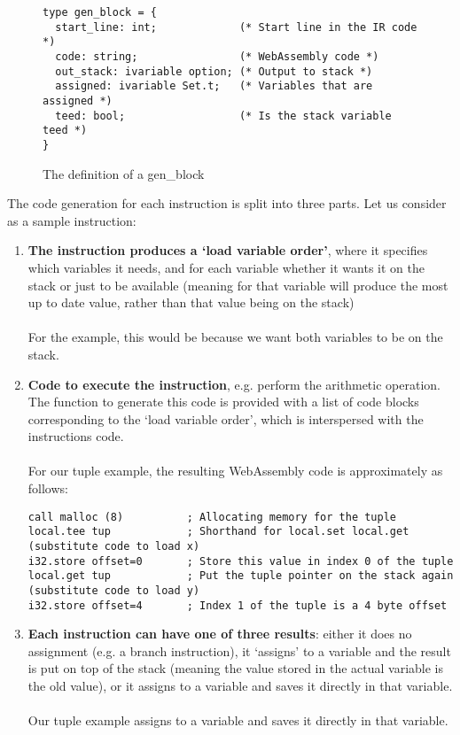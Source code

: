 \begin{figure}[h]
\begin{verbatim}
type gen_block = {
  start_line: int;             (* Start line in the IR code *)
  code: string;                (* WebAssembly code *)
  out_stack: ivariable option; (* Output to stack *)
  assigned: ivariable Set.t;   (* Variables that are assigned *)
  teed: bool;                  (* Is the stack variable teed *)
}
\end{verbatim}
\caption{The definition of a gen\_block}
\label{fig:genblock}
\end{figure}

The code generation for each instruction is split into three parts. Let us consider  as a sample instruction:
\begin{enumerate}
\item \textbf{The instruction produces a `load variable order'}, where it specifies which variables it needs, and for each variable whether it wants it on the stack or just to be available (meaning  for that variable will produce the most up to date value, rather than that value being on the stack)
\\\\
For the example, this would be  because we want both variables to be on the stack.

\item \textbf{Code to execute the instruction}, e.g. perform the arithmetic operation. The function to generate this code is provided with a list of code blocks corresponding to the `load variable order', which is interspersed with the instructions code.
\\\\
For our tuple example, the resulting WebAssembly code is approximately as follows:
\begin{verbatim}
call malloc (8)          ; Allocating memory for the tuple
local.tee tup            ; Shorthand for local.set local.get
(substitute code to load x)
i32.store offset=0       ; Store this value in index 0 of the tuple
local.get tup            ; Put the tuple pointer on the stack again
(substitute code to load y)
i32.store offset=4       ; Index 1 of the tuple is a 4 byte offset
\end{verbatim}

\item \textbf{Each instruction can have one of three results}: either it does no assignment (e.g. a branch instruction), it `assigns' to a variable and the result is put on top of the stack (meaning the value stored in the actual variable is the old value), or it assigns to a variable and saves it directly in that variable.
\\\\
Our tuple example assigns to a variable and saves it directly in that variable.
\end{enumerate}
